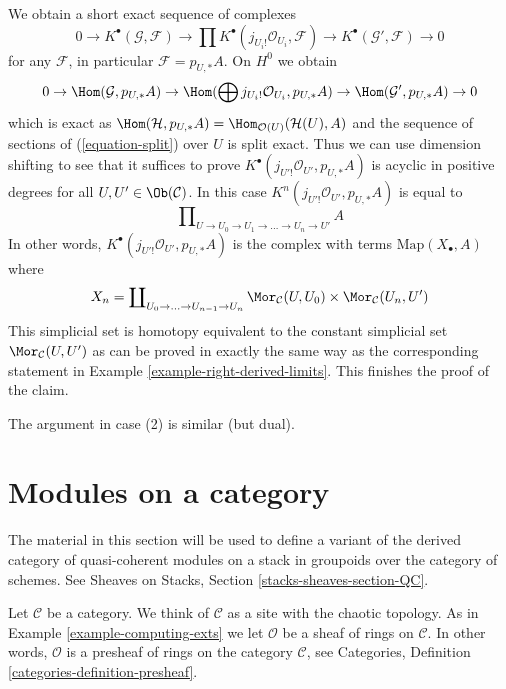 \begin{example}
We obtain a short exact sequence of complexes
$$
0 \to
K^\bullet(\mathcal{G}, \mathcal{F}) \to
\prod K^\bullet(j_{U_i!}\mathcal{O}_{U_i}, \mathcal{F}) \to
K^\bullet(\mathcal{G}', \mathcal{F}) \to 0
$$
for any $\mathcal{F}$, in particular $\mathcal{F} = p_{U, *}A$.
On $H^0$ we obtain
$$
0 \to \Hom(\mathcal{G}, p_{U, *}A) \to
\Hom(\bigoplus j_{U_i!}\mathcal{O}_{U_i}, p_{U, *}A) \to
\Hom(\mathcal{G}', p_{U, *}A) \to 0
$$
which is exact as
$\Hom(\mathcal{H}, p_{U, *}A) = \Hom_{\mathcal{O}(U)}(\mathcal{H}(U), A)$
and the sequence of sections of (\ref{equation-split}) over $U$ is split exact.
Thus we can use dimension shifting to see that it suffices to prove
$K^\bullet(j_{U'!}\mathcal{O}_{U'}, p_{U, *}A)$ is acyclic in positive
degrees for all $U, U' \in \Ob(\mathcal{C})$. In this case
$K^n(j_{U'!}\mathcal{O}_{U'}, p_{U, *}A)$ is equal to
$$
\prod\nolimits_{U \to U_0 \to U_1 \to \ldots \to U_n \to U'} A
$$
In other words, $K^\bullet(j_{U'!}\mathcal{O}_{U'}, p_{U, *}A)$
is the complex with terms $\text{Map}(X_\bullet, A)$ where
$$
X_n = \coprod\nolimits_{U_0 \to \ldots \to U_{n - 1} \to U_n}
\Mor_\mathcal{C}(U, U_0) \times \Mor_\mathcal{C}(U_n, U')
$$
This simplicial set is homotopy equivalent to the constant simplicial
set $\Mor_\mathcal{C}(U, U')$ as can be proved in exactly the same way
as the corresponding statement in Example \ref{example-right-derived-limits}.
This finishes the proof of the claim.

\medskip\noindent
The argument in case (2) is similar (but dual).
\end{example}






\section{Modules on a category}
\label{section-modules-cohomology}

\noindent
The material in this section will be used to define a variant of the
derived category of quasi-coherent modules on a stack in groupoids
over the category of schemes. See
Sheaves on Stacks, Section \ref{stacks-sheaves-section-QC}.

\medskip\noindent
Let $\mathcal{C}$ be a category. We think of $\mathcal{C}$ as a site with
the chaotic topology. As in Example \ref{example-computing-exts} we let
$\mathcal{O}$ be a sheaf of rings on $\mathcal{C}$.
In other words, $\mathcal{O}$ is
a presheaf of rings on the category $\mathcal{C}$, see
Categories, Definition \ref{categories-definition-presheaf}.

